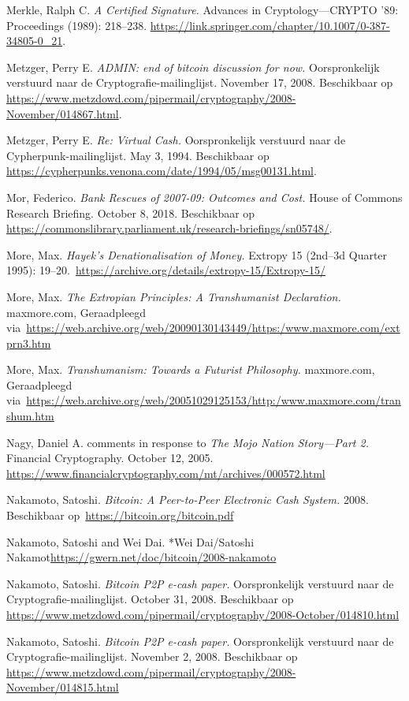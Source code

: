 \documentclass[
  a5paper,
  smalldemyvopaper,11pt,twoside,onecolumn,openright,extrafontsizes,
hidelinks]{memoir}
\begin{document}
{Merkle, Ralph C. \emph{A Certified Signature.} Advances in
Cryptology---CRYPTO '89: Proceedings (1989): 218--238.
\url{https://link.springer.com/chapter/10.1007/0-387-34805-0_21}.

Metzger, Perry E. \emph{ADMIN: end of bitcoin discussion for now.}
Oorspronkelijk verstuurd naar de Cryptografie-mailinglijst. November 17,
2008. Beschikbaar op
\url{https://www.metzdowd.com/pipermail/cryptography/2008-November/014867.html}.

Metzger, Perry E. \emph{Re: Virtual Cash.} Oorspronkelijk verstuurd naar
de Cypherpunk-mailinglijst. May 3, 1994. Beschikbaar op
\url{https://cypherpunks.venona.com/date/1994/05/msg00131.html}.

Mor, Federico. \emph{Bank Rescues of 2007-09: Outcomes and Cost.} House
of Commons Research Briefing. October 8, 2018. Beschikbaar op
\url{https://commonslibrary.parliament.uk/research-briefings/sn05748/}.

More, Max. \emph{Hayek's Denationalisation of Money.} Extropy 15
(2nd--3d Quarter 1995):
19--20.~\url{https://archive.org/details/extropy-15/Extropy-15/}

More, Max. \emph{The Extropian Principles: A Transhumanist Declaration.}
maxmore.com, Geraadpleegd
via~\url{https://web.archive.org/web/20090130143449/https:/www.maxmore.com/extprn3.htm}

More, Max. \emph{Transhumanism: Towards a Futurist Philosophy.}
maxmore.com, Geraadpleegd
via~\url{https://web.archive.org/web/20051029125153/http:/www.maxmore.com/transhum.htm}

Nagy, Daniel A. comments in response to \emph{The Mojo Nation
Story---Part 2.} Financial Cryptography. October 12, 2005.
\url{https://www.financialcryptography.com/mt/archives/000572.html}

Nakamoto, Satoshi. \emph{Bitcoin: A Peer-to-Peer Electronic Cash
System.} 2008. Beschikbaar op~\url{https://bitcoin.org/bitcoin.pdf}

Nakamoto, Satoshi and Wei Dai. *Wei Dai/Satoshi
Nakamot\url{https://gwern.net/doc/bitcoin/2008-nakamoto}

Nakamoto, Satoshi. \emph{Bitcoin P2P e-cash paper.} Oorspronkelijk
verstuurd naar de Cryptografie-mailinglijst. October 31, 2008.
Beschikbaar op
\url{https://www.metzdowd.com/pipermail/cryptography/2008-October/014810.html}

Nakamoto, Satoshi. \emph{Bitcoin P2P e-cash paper.} Oorspronkelijk
verstuurd naar de Cryptografie-mailinglijst. November 2, 2008.
Beschikbaar op
\url{https://www.metzdowd.com/pipermail/cryptography/2008-November/014815.html}

}
\end{document}
